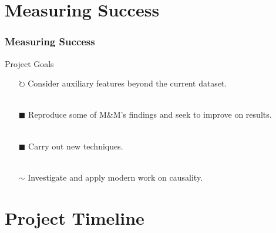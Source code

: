 \documentclass{beamer}
\begin{document}
\section {Measuring Success}
\begin{frame}[t]
\frametitle{Measuring Success}
Project Goals
\begin{itemize}
\item[$\circlearrowright$] Consider auxiliary features beyond the current dataset. \\~\\
\item[$\blacksquare$] Reproduce some of M\&M's findings and seek to improve on results. \\~\\
\item[$\blacksquare$] Carry out new techniques. \\~\\
\item[$\sim$] Investigate and apply modern work on causality.
\end{itemize}
\end{frame}
\section {Project Timeline}
\end{document}
